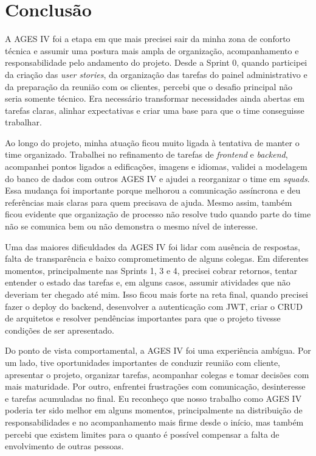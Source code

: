 \section[Conclusão]{Conclusão}

A AGES IV foi a etapa em que mais precisei sair da minha zona de conforto técnica e assumir uma postura mais ampla de organização, acompanhamento e responsabilidade pelo andamento do projeto. Desde a Sprint 0, quando participei da criação das \textit{user stories}, da organização das tarefas do painel administrativo e da preparação da reunião com os clientes, percebi que o desafio principal não seria somente técnico. Era necessário transformar necessidades ainda abertas em tarefas claras, alinhar expectativas e criar uma base para que o time conseguisse trabalhar.

Ao longo do projeto, minha atuação ficou muito ligada à tentativa de manter o time organizado. Trabalhei no refinamento de tarefas de \textit{frontend} e \textit{backend}, acompanhei pontos ligados a edificações, imagens e idiomas, validei a modelagem do banco de dados com outros AGES IV e ajudei a reorganizar o time em \textit{squads}. Essa mudança foi importante porque melhorou a comunicação assíncrona e deu referências mais claras para quem precisava de ajuda. Mesmo assim, também ficou evidente que organização de processo não resolve tudo quando parte do time não se comunica bem ou não demonstra o mesmo nível de interesse.

Uma das maiores dificuldades da AGES IV foi lidar com ausência de respostas, falta de transparência e baixo comprometimento de alguns colegas. Em diferentes momentos, principalmente nas Sprints 1, 3 e 4, precisei cobrar retornos, tentar entender o estado das tarefas e, em alguns casos, assumir atividades que não deveriam ter chegado até mim. Isso ficou mais forte na reta final, quando precisei fazer o deploy do backend, desenvolver a autenticação com JWT, criar o CRUD de arquitetos e resolver pendências importantes para que o projeto tivesse condições de ser apresentado.

Do ponto de vista comportamental, a AGES IV foi uma experiência ambígua. Por um lado, tive oportunidades importantes de conduzir reunião com cliente, apresentar o projeto, organizar tarefas, acompanhar colegas e tomar decisões com mais maturidade. Por outro, enfrentei frustrações com comunicação, desinteresse e tarefas acumuladas no final. Eu reconheço que nosso trabalho como AGES IV poderia ter sido melhor em alguns momentos, principalmente na distribuição de responsabilidades e no acompanhamento mais firme desde o início, mas também percebi que existem limites para o quanto é possível compensar a falta de envolvimento de outras pessoas.

